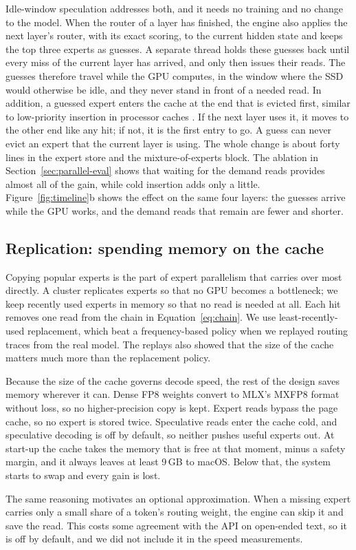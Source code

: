 Idle-window speculation addresses both, and it needs no training and no change to the model. When the router of a layer has finished, the engine also applies the next layer's router, with its exact scoring, to the current hidden state and keeps the top three experts as guesses. A separate thread holds these guesses back until every miss of the current layer has arrived, and only then issues their reads. The guesses therefore travel while the GPU computes, in the window where the SSD would otherwise be idle, and they never stand in front of a needed read. In addition, a guessed expert enters the cache at the end that is evicted first, similar to low-priority insertion in processor caches \citep{qureshi2007}. If the next layer uses it, it moves to the other end like any hit; if not, it is the first entry to go. A guess can never evict an expert that the current layer is using. The whole change is about forty lines in the expert store and the mixture-of-experts block. The ablation in Section~\ref{sec:parallel-eval} shows that waiting for the demand reads provides almost all of the gain, while cold insertion adds only a little. Figure~\ref{fig:timeline}b shows the effect on the same four layers: the guesses arrive while the GPU works, and the demand reads that remain are fewer and shorter.

\subsection{Replication: spending memory on the cache}
\label{sec:replication}
Copying popular experts is the part of expert parallelism that carries over most directly. A cluster replicates experts so that no GPU becomes a bottleneck; we keep recently used experts in memory so that no read is needed at all. Each hit removes one read from the chain in Equation~\eqref{eq:chain}. We use least-recently-used replacement, which beat a frequency-based policy when we replayed routing traces from the real model. The replays also showed that the size of the cache matters much more than the replacement policy.

Because the size of the cache governs decode speed, the rest of the design saves memory wherever it can. Dense FP8 weights convert to MLX's MXFP8 format without loss, so no higher-precision copy is kept. Expert reads bypass the page cache, so no expert is stored twice. Speculative reads enter the cache cold, and speculative decoding is off by default, so neither pushes useful experts out. At start-up the cache takes the memory that is free at that moment, minus a safety margin, and it always leaves at least 9\,GB to macOS. Below that, the system starts to swap and every gain is lost.

The same reasoning motivates an optional approximation. When a missing expert carries only a small share of a token's routing weight, the engine can skip it and save the read. This costs some agreement with the API on open-ended text, so it is off by default, and we did not include it in the speed measurements.
